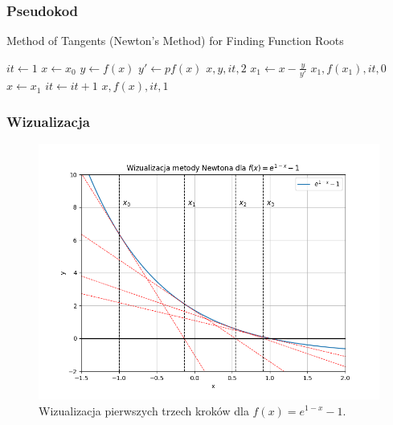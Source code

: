 \documentclass{article}
\begin{document}
\subsubsection*{Pseudokod}
\begin{algorithm}[H]
  \caption{Method of Tangents (Newton's Method) for Finding Function Roots}
  \begin{algorithmic}[1]
      \State $it \gets 1$
      \State $x \gets x_0$
          \State $y \gets f(x)$
          \State $y' \gets pf(x)$
              \State \Return $x, y, it, 2$
          \EndIf
          \State $x_1 \gets x - \frac{y}{y'}$
              \State \Return $x_1, f(x_1), it, 0$
          \EndIf
          \State $x \gets x_1$
          \State $it \gets it + 1$
      \EndWhile
      \State \Return $x, f(x), it, 1$
  \EndProcedure
  \end{algorithmic}
  \end{algorithm}

\subsubsection*{Wizualizacja}
\begin{figure}[H]
  \centering
  \includegraphics[width=\textwidth]{./ex2.png}
  \caption{Wizualizacja pierwszych trzech kroków dla $f(x) = e^{1-x} - 1$.}
\end{figure}
\end{document}
